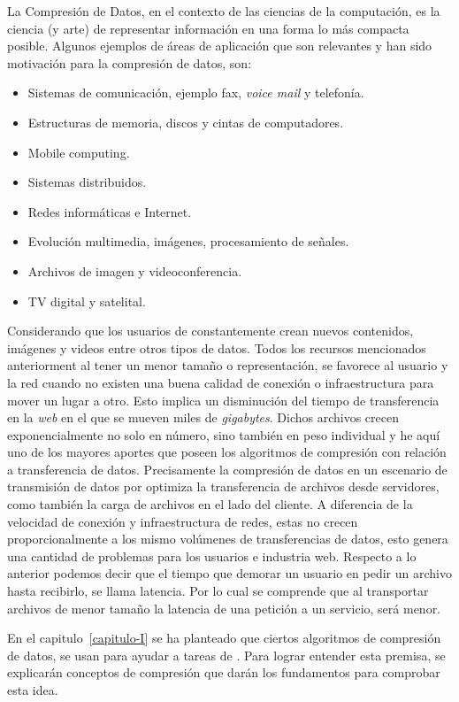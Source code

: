 
 
La Compresión de Datos, en el contexto de las ciencias de la computación, es la ciencia (y arte) de representar información en una forma lo más compacta posible. Algunos ejemplos de áreas de aplicación que son relevantes y han sido motivación para la compresión de datos, son:

\begin{itemize}
	\menorEspacioItemize

	\item Sistemas de comunicación, ejemplo fax, \emph{voice mail} y telefonía.
	\item Estructuras de memoria, discos y cintas de computadores.
	\item Mobile computing.
	\item Sistemas distribuidos.
	\item Redes informáticas e Internet.
	\item Evolución multimedia, imágenes, procesamiento de señales.
	\item Archivos de imagen y videoconferencia.
	\item TV digital y satelital.

\end{itemize}


Considerando que los usuarios de \inet constantemente  crean nuevos contenidos, imágenes y videos  entre otros tipos de datos. Todos los recursos mencionados anteriorment al tener un menor tamaño o representación, se favorece al usuario y la red cuando no existen una buena calidad de conexión o infraestructura para mover un lugar a otro. Esto implica un disminución del tiempo de transferencia en la \emph{web} en el que se mueven miles de \emph{gigabytes}. Dichos archivos crecen exponencialmente no solo en número, sino también en peso individual y he aquí uno de los mayores aportes que poseen los algoritmos de compresión con relación a transferencia de datos. Precisamente la compresión de datos en un escenario de transmisión de datos por \inet optimiza la transferencia de archivos desde servidores, como también la carga de archivos en el lado del cliente. A diferencia de la velocidad de conexión y infraestructura de redes, estas no crecen proporcionalmente a los mismo volúmenes de transferencias de datos, esto genera una cantidad de problemas para los usuarios e industria web. Respecto a lo anterior podemos decir que el tiempo que demorar un usuario en pedir un archivo hasta recibirlo, se llama latencia. Por lo cual se comprende que al transportar archivos de menor tamaño la latencia de una petición a un servicio, será menor.


En el capitulo~\ref{capitulo-I} se ha planteado que ciertos algoritmos de compresión de datos, se usan para ayudar a tareas de \machinelearning. Para lograr entender esta premisa, se explicarán conceptos de compresión que darán los fundamentos para comprobar esta idea.


